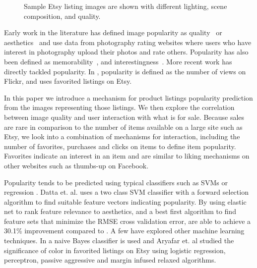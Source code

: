 \documentclass[conference,a4paper]{IEEEtran}
\begin{document}
\begin{figure}
  \caption{
  Sample Etsy listing images are shown with different lighting, scene composition, and quality.
  }
  \label{fig:etsylistings}
\end{figure}

Early work in the literature has defined image popularity as quality~\cite{ke2006design} or aesthetics~\cite{datta2006studying} and use data from photography rating websites where users who have interest in photography upload their photos and rate others. Popularity has also been defined as memorability~\cite{isola2011makes}, and interestingness~\cite{dhar2011high,gygli2013interestingness}.  More recent work has directly tackled popularity.  In \cite{khosla2014makes}, popularity is defined as the number of views on Flickr, and \cite{aryafar2014exploring} uses favorited listings on Etsy.


In this paper we introduce a mechanism for product listings popularity prediction from the images representing those listings. We then explore the correlation between image quality and user interaction with what is for sale. Because sales are rare in comparison to the number of items available on a large site such as Etsy, we look into a combination of mechanisms for interaction, including the number of favorites, purchases and clicks on items to define item popularity. Favorites indicate an interest in an item and are similar to liking mechanisms on other websites such as thumbs-up on Facebook.

Popularity tends to be predicted using typical classifiers such as SVMs or regression \cite{datta2006studying} \cite{khosla2014makes} \cite{chen2014aesthetic} \cite{wang2015automatic}.  Datta et. al. \cite{datta2006studying} uses a two class SVM classifier with a forward selection algorithm to find suitable feature vectors indicating popularity.  By using elastic net to rank feature relevance to aesthetics, and a best first algorithm to find feature sets that minimize the RMSE cross validation error, \cite{wang2015automatic} are able to achieve a 30.1\% improvement compared to \cite{chen2014aesthetic}.  A few have explored other machine learning techniques.  In \cite{ke2006design} a naive Bayes classifier is used and Aryafar et. al \cite{aryafar2014exploring} studied the significance of color in favorited listings on Etsy using logistic regression, perceptron, passive aggressive and margin infused relaxed algorithms.
\end{document}
